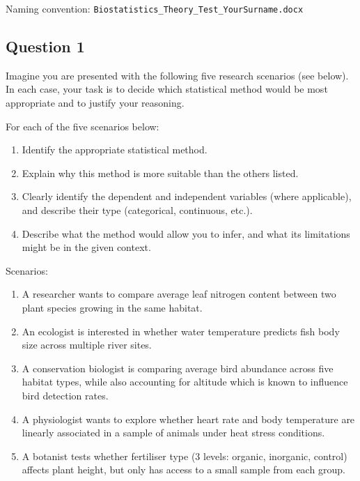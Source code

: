 \documentclass[
  10t,
]{article}
\providecommand{\tightlist}{%
  \setlength{\itemsep}{0pt}\setlength{\parskip}{0pt}}
\let\oldtexttt\texttt
\renewcommand{\texttt}[1]{\oldtexttt{\small #1}}
\begin{document}
Naming convention:
\texttt{Biostatistics\_Theory\_Test\_YourSurname.docx}

\subsection{Question 1}\label{question-1}

Imagine you are presented with the following five research scenarios
(see below). In each case, your task is to decide which statistical
method would be most appropriate and to justify your reasoning.

For each of the five scenarios below:

\begin{enumerate}
\def\labelenumi{\alph{enumi}.}
\tightlist
\item
  Identify the appropriate statistical method.
\item
  Explain why this method is more suitable than the others listed.
\item
  Clearly identify the dependent and independent variables (where
  applicable), and describe their type (categorical, continuous, etc.).
\item
  Describe what the method would allow you to infer, and what its
  limitations might be in the given context.
\end{enumerate}

Scenarios:

\begin{enumerate}
\def\labelenumi{\arabic{enumi}.}
\tightlist
\item
  A researcher wants to compare average leaf nitrogen content between
  two plant species growing in the same habitat.
\item
  An ecologist is interested in whether water temperature predicts fish
  body size across multiple river sites.
\item
  A conservation biologist is comparing average bird abundance across
  five habitat types, while also accounting for altitude which is known
  to influence bird detection rates.
\item
  A physiologist wants to explore whether heart rate and body
  temperature are linearly associated in a sample of animals under heat
  stress conditions.
\item
  A botanist tests whether fertiliser type (3 levels: organic,
  inorganic, control) affects plant height, but only has access to a
  small sample from each group.
\end{enumerate}
\end{document}
